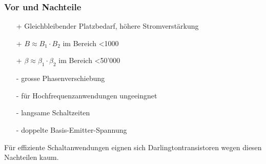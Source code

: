 \subsubsection{Vor und Nachteile}
\vspace{-0.5cm}
\begin{multicols}{2}
    \begin{minipage}{\linewidth}
        \begin{itemize}
            \item [+] Gleichbleibender Platzbedarf, höhere Stromverstärkung
            \item [+] $ B \approx B_1 \cdot B_2 $ im Bereich <1000 
            \item [+] $ \beta \approx \beta_1 \cdot \beta_2 $ im Bereich <50'000
        \end{itemize}
    \end{minipage}
    
    \begin{minipage}{1.2\linewidth}
        \begin{itemize}
            \item [-] grosse Phasenverschiebung
            \item [-] für Hochfrequenzanwendungen ungeeingnet
            \item [-] langsame Schaltzeiten
            \item [-] doppelte Basis-Emitter-Spannung
        \end{itemize}
    \end{minipage}
\end{multicols}
Für effiziente Schaltanwendungen eignen sich Darlingtontransistoren wegen diesen Nachteilen kaum.

